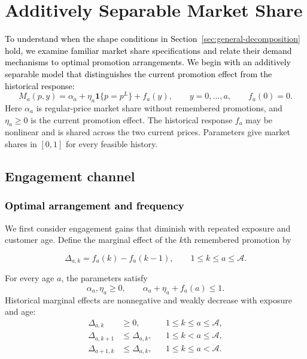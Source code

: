 \section{Additively Separable Market Share}
\label{sec:affine}
\textcolor{black}{To understand when the shape conditions in Section~\ref{sec:general-decomposition} hold, we examine familiar market share specifications and relate their demand mechanisms to optimal promotion arrangements. We begin with an additively separable model that distinguishes the current promotion effect from the historical response:}
\begin{equation}\label{eq:additive-market-share}
 M_a(p,y)=\alpha_a+\eta_a\mathbf1\{p=p^L\}+f_a(y),
 \qquad y=0,\ldots,a,\qquad f_a(0)=0.
\end{equation}
Here \(\alpha_a\) is regular-price market share without remembered promotions, and \(\eta_a\ge0\) is the current promotion effect. The historical response \(f_a\) may be nonlinear and is shared across the two current prices. Parameters give market shares in \([0,1]\) for every feasible history.

\begingroup\color{black}
\subsection{Engagement channel}
\label{sec:balanced}
\label{sec:affine-frequency}
\subsubsection{\texorpdfstring{\textcolor{black}{Optimal arrangement and frequency}}{Optimal arrangement and frequency}}
\begingroup\color{black}
We first consider engagement gains that diminish with repeated exposure and customer age. Define the marginal effect of the \(k\)th remembered promotion by
\par\endgroup
\[
 \Delta_{a,k}=f_a(k)-f_a(k-1),
 \qquad 1\le k\le a\le\mathcal A.
\]

\begin{assumption}
\label{ass:additive-engagement}
\label{ass:affine-monotone}
For every age \(a\), the parameters satisfy
\[
 \alpha_a,\eta_a\ge0,
 \qquad \alpha_a+\eta_a+f_a(a)\le1.
\]
Historical marginal effects are nonnegative and weakly decrease with exposure and age:
\[
\begin{aligned}
 \Delta_{a,k}&\ge0,
     &&1\le k\le a\le\mathcal A,\\
 \Delta_{a,k+1}&\le\Delta_{a,k},
     &&1\le k<a\le\mathcal A,\\
 \Delta_{a+1,k}&\le\Delta_{a,k},
     &&1\le k\le a<\mathcal A.
\end{aligned}
\]
\end{assumption}

